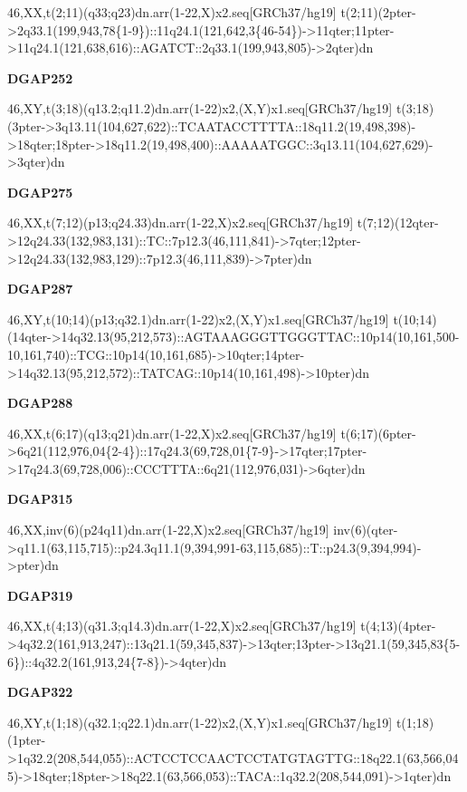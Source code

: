 \documentclass[a4paper,twoside=true,openright,parskip=full,chapterprefix=true,11pt,headings=normal,bibliography=totoc,listof=totoc,titlepage=on,captions=tableabove,draft=false]{scrreprt}
\theoremstyle{definition}
\theoremstyle{definition}
\theoremstyle{definition}
\theoremstyle{remark}
\begin{document}
46,XX,t(2;11)(q33;q23)dn.arr(1-22,X)x2.seq{[}GRCh37/hg19{]}
t(2;11)(2pter-\textgreater{}2q33.1(199,943,78\{1-9\})::11q24.1(121,642,3\{46-54\})-\textgreater{}11qter;11pter-\textgreater{}11q24.1(121,638,616)::AGATCT::2q33.1(199,943,805)-\textgreater{}2qter)dn

\textbf{DGAP252}

46,XY,t(3;18)(q13.2;q11.2)dn.arr(1-22)x2,(X,Y)x1.seq{[}GRCh37/hg19{]}
t(3;18)(3pter-\textgreater{}3q13.11(104,627,622)::TCAATACCTTTTA::18q11.2(19,498,398)-\textgreater{}18qter;18pter-\textgreater{}18q11.2(19,498,400)::AAAAATGGC::3q13.11(104,627,629)-\textgreater{}3qter)dn

\textbf{DGAP275}

46,XX,t(7;12)(p13;q24.33)dn.arr(1-22,X)x2.seq{[}GRCh37/hg19{]}
t(7;12)(12qter-\textgreater{}12q24.33(132,983,131)::TC::7p12.3(46,111,841)-\textgreater{}7qter;12pter-\textgreater{}12q24.33(132,983,129)::7p12.3(46,111,839)-\textgreater{}7pter)dn

\textbf{DGAP287}

46,XY,t(10;14)(p13;q32.1)dn.arr(1-22)x2,(X,Y)x1.seq{[}GRCh37/hg19{]}
t(10;14)(14qter-\textgreater{}14q32.13(95,212,573)::AGTAAAGGGTTGGGTTAC::10p14(10,161,500-10,161,740)::TCG::10p14(10,161,685)-\textgreater{}10qter;14pter-\textgreater{}14q32.13(95,212,572)::TATCAG::10p14(10,161,498)-\textgreater{}10pter)dn

\textbf{DGAP288}

46,XX,t(6;17)(q13;q21)dn.arr(1-22,X)x2.seq{[}GRCh37/hg19{]}
t(6;17)(6pter-\textgreater{}6q21(112,976,04\{2-4\})::17q24.3(69,728,01\{7-9\}-\textgreater{}17qter;17pter-\textgreater{}17q24.3(69,728,006)::CCCTTTA::6q21(112,976,031)-\textgreater{}6qter)dn

\textbf{DGAP315}

46,XX,inv(6)(p24q11)dn.arr(1-22,X)x2.seq{[}GRCh37/hg19{]}
inv(6)(qter-\textgreater{}q11.1(63,115,715)::p24.3q11.1(9,394,991-63,115,685)::T::p24.3(9,394,994)-\textgreater{}pter)dn

\textbf{DGAP319}

46,XX,t(4;13)(q31.3;q14.3)dn.arr(1-22,X)x2.seq{[}GRCh37/hg19{]}
t(4;13)(4pter-\textgreater{}4q32.2(161,913,247)::13q21.1(59,345,837)-\textgreater{}13qter;13pter-\textgreater{}13q21.1(59,345,83\{5-6\})::4q32.2(161,913,24\{7-8\})-\textgreater{}4qter)dn

\textbf{DGAP322}

46,XY,t(1;18)(q32.1;q22.1)dn.arr(1-22)x2,(X,Y)x1.seq{[}GRCh37/hg19{]}
t(1;18)(1pter-\textgreater{}1q32.2(208,544,055)::ACTCCTCCAACTCCTATGTAGTTG::18q22.1(63,566,045)-\textgreater{}18qter;18pter-\textgreater{}18q22.1(63,566,053)::TACA::1q32.2(208,544,091)-\textgreater{}1qter)dn
\end{document}
